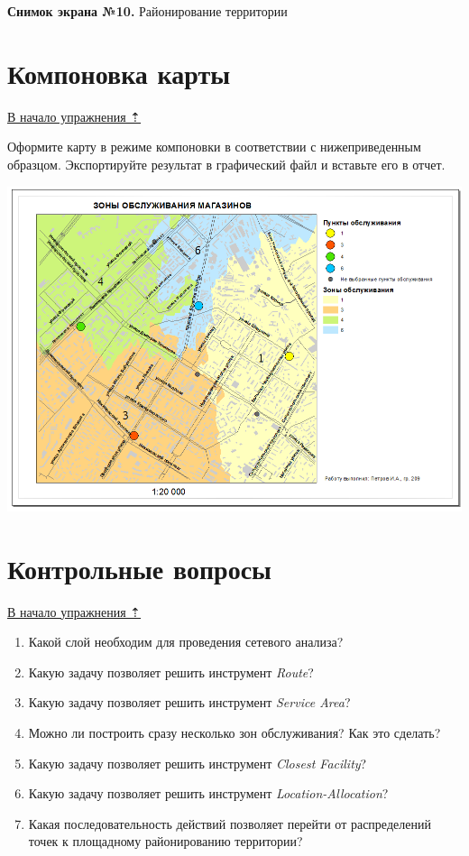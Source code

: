 \documentclass[]{book}
\theoremstyle{definition}
\theoremstyle{definition}
\theoremstyle{definition}
\theoremstyle{remark}
\begin{document}
\textbf{Снимок экрана №10.} Районирование территории

\hypertarget{network-analysis-layout}{%
\section{Компоновка карты}\label{network-analysis-layout}}

\protect\hyperlink{network-analysis}{В начало упражнения ⇡}

Оформите карту в режиме компоновки в соответствии с нижеприведенным
образцом. Экспортируйте результат в графический файл и вставьте его в
отчет.

\includegraphics{images/Ex12/image36.png}

\hypertarget{network-analysis-questions}{%
\section{Контрольные вопросы}\label{network-analysis-questions}}

\protect\hyperlink{network-analysis}{В начало упражнения ⇡}

\begin{enumerate}
\def\labelenumi{\arabic{enumi}.}
\item
  Какой слой необходим для проведения сетевого анализа?
\item
  Какую задачу позволяет решить инструмент \emph{Route}?
\item
  Какую задачу позволяет решить инструмент \emph{Service Area}?
\item
  Можно ли построить сразу несколько зон обслуживания? Как это сделать?
\item
  Какую задачу позволяет решить инструмент \emph{Closest Facility}?
\item
  Какую задачу позволяет решить инструмент \emph{Location-Allocation}?
\item
  Какая последовательность действий позволяет перейти от распределений
  точек к площадному районированию территории?
\end{enumerate}
\end{document}

